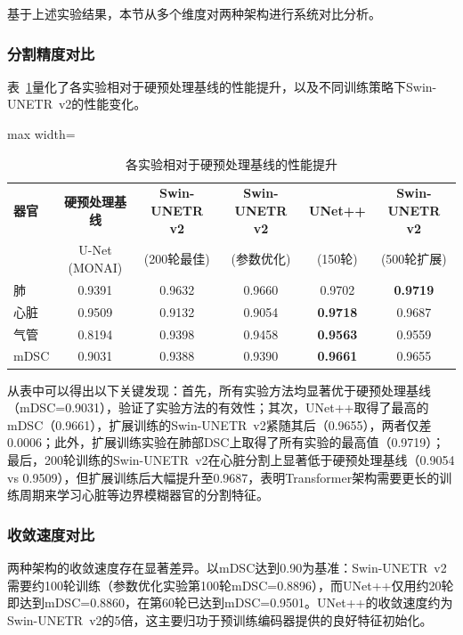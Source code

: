 \documentclass[12pt, a4paper]{article}
\begin{document}
基于上述实验结果，本节从多个维度对两种架构进行系统对比分析。

\subsubsection{分割精度对比}

表~\ref{tab:improvement}量化了各实验相对于硬预处理基线的性能提升，以及不同训练策略下Swin-UNETR~v2的性能变化。

\begin{table}[H]
    \centering
    \caption{各实验相对于硬预处理基线的性能提升}
    \label{tab:improvement}
    \begin{adjustbox}{max width=\textwidth}
    \begin{tabular}{@{}lccccc@{}}
        \toprule
        \textbf{器官} & \textbf{硬预处理基线} & \textbf{Swin-UNETR v2} & \textbf{Swin-UNETR v2} & \textbf{UNet++} & \textbf{Swin-UNETR v2} \\
        & U-Net (MONAI) & (200轮最佳) & (参数优化) & (150轮) & (500轮扩展) \\
        \midrule
        肺 & 0.9391 & 0.9632 & 0.9660 & 0.9702 & \textbf{0.9719} \\
        心脏 & 0.9509 & 0.9132 & 0.9054 & \textbf{0.9718} & 0.9687 \\
        气管 & 0.8194 & 0.9398 & 0.9458 & \textbf{0.9563} & 0.9559 \\
        mDSC & 0.9031 & 0.9388 & 0.9390 & \textbf{0.9661} & 0.9655 \\
        \bottomrule
    \end{tabular}
    \end{adjustbox}
\end{table}

从表中可以得出以下关键发现：首先，所有实验方法均显著优于硬预处理基线（mDSC=0.9031），验证了实验方法的有效性；其次，UNet++取得了最高的mDSC（0.9661），扩展训练的Swin-UNETR~v2紧随其后（0.9655），两者仅差0.0006；此外，扩展训练实验在肺部DSC上取得了所有实验的最高值（0.9719）；最后，200轮训练的Swin-UNETR~v2在心脏分割上显著低于硬预处理基线（0.9054 vs 0.9509），但扩展训练后大幅提升至0.9687，表明Transformer架构需要更长的训练周期来学习心脏等边界模糊器官的分割特征。

\subsubsection{收敛速度对比}

两种架构的收敛速度存在显著差异。以mDSC达到0.90为基准：Swin-UNETR~v2需要约100轮训练（参数优化实验第100轮mDSC=0.8896），而UNet++仅用约20轮即达到mDSC=0.8860，在第60轮已达到mDSC=0.9501。UNet++的收敛速度约为Swin-UNETR~v2的5倍，这主要归功于预训练编码器提供的良好特征初始化。
\end{document}
